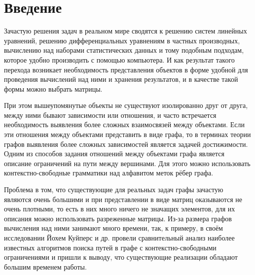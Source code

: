\documentclass[14pt]{matmex-diploma}
\begin{document}

\section*{Введение}


Зачастую решения задач в реальном мире сводятся к решению
систем линейных уравнений, решению дифференциальных уравнениям в частных производных,
вычислению над наборами статистических данных и тому подобным подходам, 
которое удобно производить с помощью компьютера.
И как результат такого перехода возникает необходимость представления объектов 
в форме удобной для проведения вычислений над ними и хранения результатов, 
и в качестве такой формы можно выбрать матрицы.

При этом вышеупомянутые объекты не существуют изолированно друг от друга, 
между ними бывают зависимости или отношения, 
и часто встречается необходимость выявления более сложных взаимосвязей между объектами.
Если эти отношения между объектами представить в виде графа, 
то в терминах теории графов выявления более сложных зависимостей является задачей достижимости.
Одним из способов
задания отношений между объектами графа является описание
ограничений на пути между вершинами. 
Для этого можно использовать контекстно-свободные грамматики над алфавитом меток рёбер графа.

Проблема в том, что существующие для реальных задач графы зачастую являются очень большими
и при представлении в виде матриц оказываются не очень плотными, 
то есть в них много ничего не значащих элементов,
для их описания можно использовать разреженные матрицы. 
Из-за размера графов вычисления над ними занимают много времени, так, к примеру,
в своём исследовании Йохем Куйперс и др. \cite{Kuijpers} провели сравнительный анализ наиболее
известных алгоритмов поиска путей в графе с контекстно-свободными ограничениями и пришли к выводу, что существующие реализации 
обладают большим временем работы.
\end{document}
